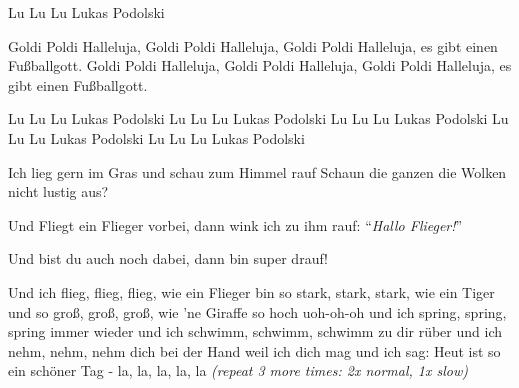 \beginchorus
Lu Lu Lu Lukas Podolski 
\endchorus

\beginverse
Goldi Poldi Halleluja,
Goldi Poldi Halleluja,
Goldi Poldi Halleluja,
es gibt einen Fußballgott.
Goldi Poldi Halleluja,
Goldi Poldi Halleluja,
Goldi Poldi Halleluja,
es gibt einen Fußballgott.
\endverse

\beginchorus
Lu Lu Lu Lukas Podolski 
Lu Lu Lu Lukas Podolski
Lu Lu Lu Lukas Podolski
Lu Lu Lu Lukas Podolski
Lu Lu Lu Lukas Podolski
\endchorus
\endsong

\beginverse
Ich lieg gern im Gras und schau zum Himmel rauf
Schaun die ganzen die Wolken nicht lustig aus?
\endverse

\beginverse
Und Fliegt ein Flieger vorbei, 
dann wink ich zu ihm rauf: ``\textit{Hallo Flieger!}''
\endverse

\beginverse
Und bist du auch noch dabei, 
dann bin super drauf!
\endverse

\beginchorus
Und ich flieg, flieg, flieg, wie ein Flieger 
bin so stark, stark, stark, 
wie ein Tiger 
und so groß, groß, groß, wie 'ne Giraffe 
so hoch uoh-oh-oh 
und ich spring, spring, spring immer wieder 
und ich schwimm, schwimm, schwimm 
zu dir rüber und ich nehm, nehm, nehm dich bei der Hand weil ich dich mag 
und ich sag: 
Heut ist so ein schöner Tag - la, la, la, la, la 
\textit{(repeat 3 more times: 2x normal, 1x slow)}
\endchorus
\endsong

